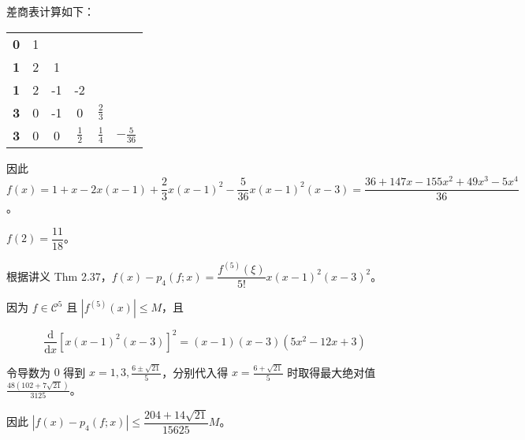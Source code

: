 \documentclass[lang=cn,a4paper,newtx,bibend=bibtex]{elegantpaper}
\begin{document}
\begin{solution}
  差商表计算如下：
  \begin{tabular}{c|ccccc}
    &  &  &  & &\\
   \hline
   \textbf{0} & 1 & & & &\\
   \textbf{1} & 2 & 1 &  &  &\\
   \textbf{1} & 2 & -1 & -2 & &\\
   \textbf{3} & 0 & -1  & 0 & $\frac23$ &\\
   \textbf{3} & 0 &  0 & $\frac{1}{2}$ & $\frac{1}{4}$&  $-\frac{5}{36}$ \\
   \end{tabular}
  
  因此 $f(x) = 1 + x - 2x(x-1) + \dfrac 23 x(x-1)^2 - \dfrac{5}{36} x(x-1)^2(x-3)=\dfrac{36 + 147x - 155x^2 + 49x^3 - 5x^4}{36}$。
  
  $f(2)=\dfrac {11}{18}$。
  
  根据讲义 Thm 2.37，$f(x) - p_4(f;x) = \dfrac{f^{(5)}(\xi)}{5!}x(x-1)^2(x-3)^2$。
  
  因为 $f\in \mathcal{C}^5$ 且 $|f^{(5)}(x)|\leq M$，且
  
  \begin{equation*}
    \dfrac{\text{d}}{\text{d}x}\left[x(x-1)^2(x-3)\right]^2 = (x-1)(x-3)(5x^2-12x+3)
  \end{equation*}
  
  令导数为 $0$ 得到 $x=1,3,\frac{6\pm \sqrt{21}}{5}$，分别代入得 $x= \frac{6+\sqrt{21}}{5}$ 时取得最大绝对值 $\frac{48(102+7\sqrt{21})}{3125}$。
  
  因此 $|f(x) - p_4(f;x)| \leq \dfrac{204+14\sqrt{21}}{15625}M$。
\end{solution}
\end{document}
